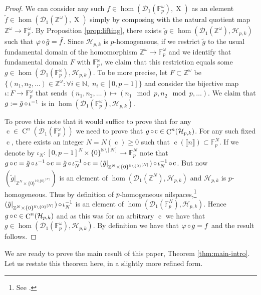 \documentclass[a4paper,12pt,reqno]{amsart}
\theoremstyle{definition}
\newcommand{\mc}{\mathcal}
\newcommand{\mb}{\mathbb}
\DeclareMathOperator{\q}{c}
\DeclareMathOperator{\ns}{X}
\DeclareMathOperator{\co}{\circ\hspace{-0.02 cm}}
\DeclareMathOperator{\cu}{C}
\newcommand*{\db}[1]{\llbracket #1\rrbracket}
\begin{document}
\begin{proof}
We can consider any such $f\in \hom(\mc{D}_1(\mb{F}_p^\omega),\ns)$ as an element $\tilde{f}\in  \hom(\mc{D}_1(\mb{Z}^\omega),\ns)$ simply by composing with the natural quotient map $\mb{Z}^\omega\to \mb{F}_p^\omega$. By Proposition \ref{prop:lifting}, there exists $\tilde{g}\in \hom(\mc{D}_1(\mb{Z}^\omega),\mc{H}_{p,k})$ such that $\varphi\co \tilde{g} = \tilde{f}$. Since $\mc{H}_{p,k}$ is $p$-homogeneous, if we restrict $\tilde  g$ to the usual fundamental domain of the homomorphism $\mb{Z}^\omega\to \mb{F}_p^\omega$ and we identify that fundamental domain $F$ with $\mb{F}_p^\omega$, we claim that this restriction equals some $g\in \hom(\mc{D}_1(\mb{F}_p^\omega),\mc{H}_{p,k})$. To be more precise, let $F\subset \mb{Z}^\omega$ be $\{(n_1,n_2,\ldots)\in \mb{Z}^\omega: \forall i\in \mb{N}, \; n_i\in[0,p-1]\}$ and consider the bijective map $\iota:F\to \mb{F}_p^\omega$ that sends $(n_1,n_2,\ldots)\mapsto (n_1\mod p,n_2 \mod p,\ldots)$. We claim that $g:=\tilde{g}\co \iota^{-1}$ is in $\hom(\mc{D}_1(\mb{F}_p^\omega),\mc{H}_{p,k})$. 


To prove this note that it would suffice to prove that for any $\q\in \cu^n(\mc{D}_1(\mb{F}_p^\omega))$ we need to prove that $g\co \q\in \cu^n(\mc{H}_{p,k})$. For any such fixed $\q$, there exists an integer $N=N(\q)\ge 0$ such that $\q(\db{n})\subset \mb{F}_p^N$. If we denote by $\iota_N:[0,p-1]^N\times\{0\}^{\mb{N}\setminus[N]}\to \mb{F}_p^N$ note that $g\co \q = \tilde{g}\co \iota^{-1}\co \q = \tilde{g} \co \iota_N^{-1}\co \q = (\tilde{g}|_{\mb{Z}^N\times \{0\}^{\mb{N}\setminus\{0\}^{[N]}}}) \co \iota_N^{-1}\co \q$. But now $(\tilde{g}|_{\mb{Z}^N\times \{0\}^{\mb{N}\setminus\{0\}^{[N]}}}) $ is an element of $\hom(\mc{D}_1(\mb{Z}^N),\mc{H}_{p,k})$ and $\mc{H}_{p,k}$ is $p$-homogeneous. Thus by definition of $p$-homogeneous nilspaces,\footnote{See \cite[Definition 1.2]{CGSS-p-hom}.} $(\tilde{g}|_{\mb{Z}^N\times \{0\}^{\mb{N}\setminus\{0\}^{[N]}}}) \co \iota_N^{-1}$ is an element of $ \hom(\mc{D}_1(\mb{F}_p^N),\mc{H}_{p,k})$. Hence $g\co \q\in \cu^n(\mc{H}_{p,k})$ and as this was for an arbitrary $\q$ we have that $g\in \hom(\mc{D}_1(\mb{F}_p^\omega),\mc{H}_{p,k})$. By definition we have that $\varphi\co g = f$ and the result follows.
\end{proof}

\noindent We are ready to prove the main result of this paper, Theorem \ref{thm:main-intro}. Let us restate this theorem here, in a slightly more refined form.
\end{document}
